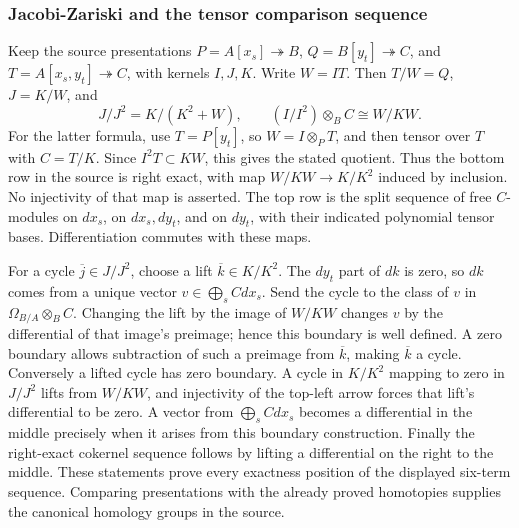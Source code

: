 \subsubsection{Jacobi-Zariski and the tensor comparison sequence}\label{jacobi-zariski-and-the-tensor-comparison-sequence}

Keep the source presentations \(P=A[x_s]\twoheadrightarrow B\), \(Q=B[y_t]\twoheadrightarrow C\), and \(T=A[x_s,y_t]\twoheadrightarrow C\), with kernels \(I,J,K\). Write \(W=IT\). Then \(T/W=Q\), \(J=K/W\), and \[
J/J^2=K/(K^2+W),\qquad
(I/I^2)\otimes_B C\cong W/KW.
\] For the latter formula, use \(T=P[y_t]\), so \(W=I\otimes_P T\), and then tensor over \(T\) with \(C=T/K\). Since \(I^2T\subset KW\), this gives the stated quotient. Thus the bottom row in the source is right exact, with map \(W/KW\to K/K^2\) induced by inclusion. No injectivity of that map is asserted. The top row is the split sequence of free \(C\)-modules on \(dx_s\), on \(dx_s,dy_t\), and on \(dy_t\), with their indicated polynomial tensor bases. Differentiation commutes with these maps.

For a cycle \(\overline j\in J/J^2\), choose a lift \(\overline k\in K/K^2\). The \(dy_t\) part of \(dk\) is zero, so \(dk\) comes from a unique vector \(v\in\bigoplus_s Cdx_s\). Send the cycle to the class of \(v\) in \(\Omega_{B/A}\otimes_B C\). Changing the lift by the image of \(W/KW\) changes \(v\) by the differential of that image's preimage; hence this boundary is well defined. A zero boundary allows subtraction of such a preimage from \(\overline k\), making \(\overline k\) a cycle. Conversely a lifted cycle has zero boundary. A cycle in \(K/K^2\) mapping to zero in \(J/J^2\) lifts from \(W/KW\), and injectivity of the top-left arrow forces that lift's differential to be zero. A vector from \(\bigoplus_s Cdx_s\) becomes a differential in the middle precisely when it arises from this boundary construction. Finally the right-exact cokernel sequence follows by lifting a differential on the right to the middle. These statements prove every exactness position of the displayed six-term sequence. Comparing presentations with the already proved homotopies supplies the canonical homology groups in the source.

